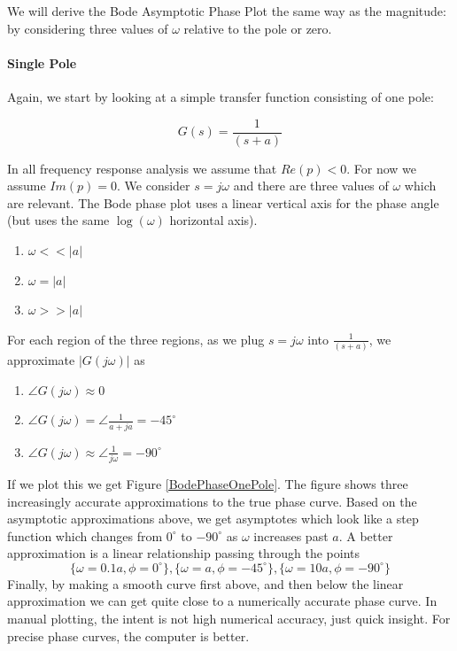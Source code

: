 We will derive the Bode Asymptotic Phase Plot the same way as the magnitude: by considering three values of $\omega$ relative to the pole or zero.

\paragraph{Single Pole}

Again, we start by looking at a simple transfer function consisting of one pole:

\[
G(s) = \frac{1}{(s+a)}
\]

In all frequency response analysis we assume that $Re(p) < 0$.  For now we assume $Im(p) = 0$.
We consider $s=j\omega$ and there are three values of $\omega$ which are relevant.
The Bode phase  plot uses a linear vertical axis for the phase angle (but uses the same $\log(\omega)$ horizontal axis).

\begin{enumerate}
  \item  $\omega << |a|$
  \item  $\omega = |a|$
  \item  $\omega >> |a|$
\end{enumerate}

For each region of the three regions,
as we plug  $s=j\omega$ into $ \frac{1}{(s+a)}$, we   approximate $|G(j\omega)|$ as

\begin{enumerate}
  \item  $\angle G(j\omega)   \approx 0$
  \item  $\angle G(j\omega) = \angle \frac{1}{a+ja}   =  -45^\circ $
  \item  $\angle G(j\omega) \approx \angle  \frac{1}{j\omega}  = -90^\circ$
\end{enumerate}


If we plot this we get Figure \ref{BodePhaseOnePole}. The figure shows three increasingly accurate approximations to the true phase curve.  Based on the asymptotic approximations above, we get asymptotes which look like a step function which changes from $0^\circ$ to $-90^\circ$ as $\omega$ increases past $a$.
A better approximation is a linear relationship passing through the points
\[
\{\omega=0.1a, \phi = 0^\circ\}, \{\omega=a, \phi = -45^\circ\}, \{\omega=10a, \phi=-90^\circ\}
\]
Finally, by making a smooth curve first above, and then below the linear approximation we can get quite close to a numerically accurate phase curve.  In manual plotting, the intent is not high numerical accuracy, just quick insight.   For precise phase curves, the computer is better.

